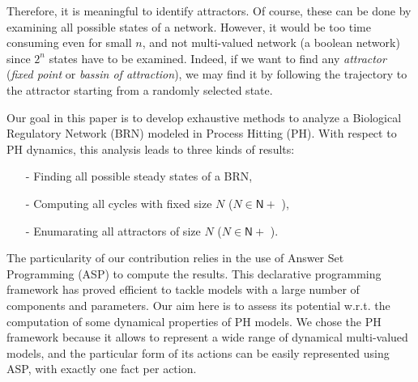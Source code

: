 Therefore, it is meaningful to identify attractors. Of course, these can be done by examining all possible states of a network. However, it would be too time consuming even for small $n$, and not multi-valued network (a boolean network) since $2^n$ states have to be examined. Indeed, if we want to find any \emph{attractor} (\emph{fixed point } or \emph{bassin of attraction}), we may find it by following the trajectory to the attractor starting from a randomly selected state.


Our goal in this paper is to develop exhaustive methods to analyze a Biological Regulatory Network (BRN) modeled in Process Hitting (PH). With respect to PH dynamics, this analysis leads to three kinds of results:
\begin{itemize}
\item[-] Finding all possible steady states of a BRN,
\item[-] Computing all cycles with fixed size $N$ ($N \in \mathsf{N}+$ ),
\item[-] Enumarating all attractors of size $N$ ($N \in \mathsf{N}+$ ).
\end{itemize}
 The particularity of our contribution relies in the use of Answer Set Programming
(ASP) \cite{baral2003knowledge}
to compute the results.
This declarative programming framework has proved efficient
to tackle models with a large number of components and parameters.
Our aim here is to assess its potential w.r.t. the computation
of some dynamical properties of PH models.
We chose the PH framework because it allows to represent a wide range of dynamical multi-valued models, and the particular form of its actions
can be easily represented using ASP,
with exactly one fact per action.
